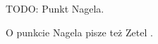 %

TODO: Punkt Nagela.

\begin{proposition}
    \label{punkt_nagela}
\end{proposition}

O punkcie Nagela pisze też Zetel \cite[s. 22, 25]{zetel_2020}.

%